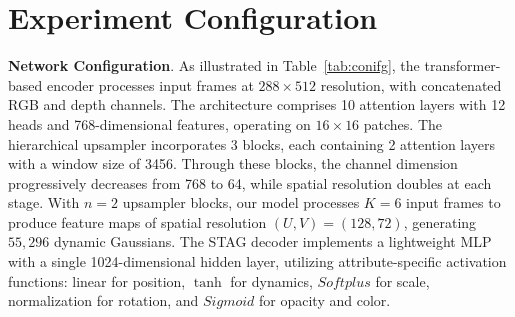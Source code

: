 \section{Experiment Configuration}
\label{app:model}
\noindent\textbf{Network Configuration}. As illustrated in Table~\ref{tab:conifg}, the transformer-based encoder processes input frames at $288 \times 512$ resolution, with concatenated RGB and depth channels. The architecture comprises 10 attention layers with 12 heads and 768-dimensional features, operating on $16 \times 16$ patches. The hierarchical upsampler incorporates 3 blocks, each containing 2 attention layers with a window size of 3456. Through these blocks, the channel dimension progressively decreases from 768 to 64, while spatial resolution doubles at each stage. With $n=2$ upsampler blocks, our model processes $K=6$ input frames to produce feature maps of spatial resolution $(U, V) = (128, 72)$, generating $55,296$ dynamic Gaussians. The STAG decoder implements a lightweight MLP with a single 1024-dimensional hidden layer, utilizing attribute-specific activation functions: linear for position, $\tanh$ for dynamics, $Softplus$ for scale, normalization for rotation, and $Sigmoid$ for opacity and color.




